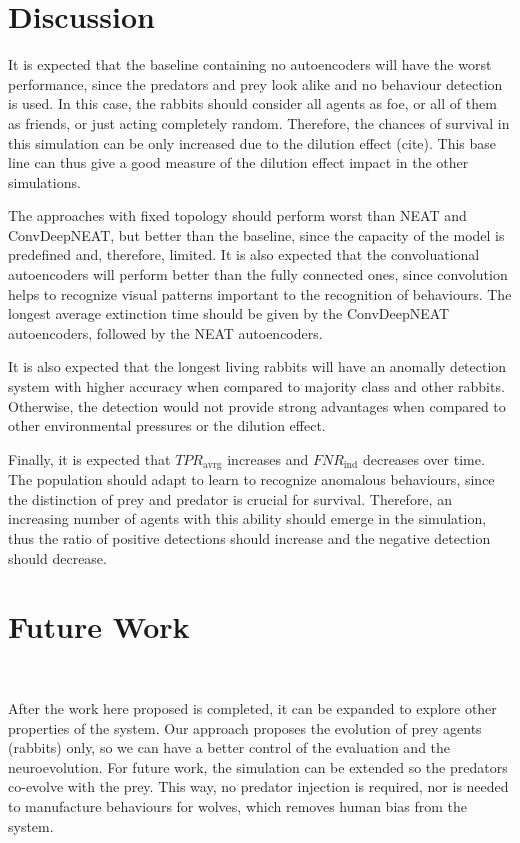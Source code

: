 \documentclass[letterpaper]{article}
\numberwithin{equation}{section}
\numberwithin{theorem}{section}
\numberwithin{lemma}{section}
\numberwithin{df}{section}
\begin{document}
\section{Discussion}

It is expected that the baseline containing no autoencoders will have  the worst performance, since the predators and prey look alike and no behaviour detection is used. In this case, the rabbits should consider all agents as foe, or all of them as friends, or just acting completely random. Therefore, the chances of survival in this simulation can be only increased due to the dilution effect (cite). This base line can thus give a good measure of the dilution effect impact in the other simulations.

The approaches with fixed topology should perform worst than NEAT and ConvDeepNEAT, but better than the baseline, since the capacity of the model is predefined and, therefore, limited. It is also expected that the convoluational autoencoders will perform better than the fully connected ones, since convolution helps to recognize visual patterns important to the recognition of behaviours. The longest average extinction time should be given by the ConvDeepNEAT autoencoders, followed by the NEAT autoencoders. 

It is also expected that the longest living rabbits will have an anomally detection system with higher accuracy when compared to majority class and other rabbits. Otherwise, the detection would not provide strong advantages when compared to other environmental pressures or the dilution effect.

Finally, it is expected that $TPR_{\text{avrg}}$ increases and $FNR_{\text{ind}}$ decreases over time. The population should adapt to learn to recognize anomalous behaviours, since the distinction of prey and predator is crucial for survival. Therefore, an increasing number of agents with this ability should emerge in the simulation, thus the ratio of positive detections should increase and the negative detection should decrease.

\section{Future Work}
\

After the work here proposed is completed, it can be expanded to explore other properties of the system. Our approach proposes the evolution of prey agents (rabbits) only, so we can have a better control of the evaluation and the neuroevolution. For future work, the simulation can be extended so the predators co-evolve with the prey. This way, no predator injection is required, nor is needed to manufacture behaviours for wolves, which removes human bias from the system.
\end{document}
